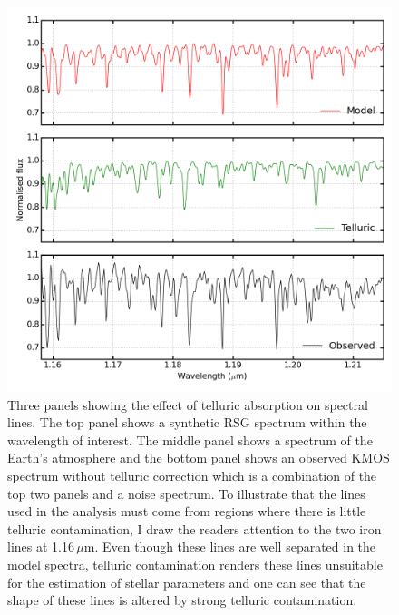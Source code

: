 \begin{figure}
 \centering
\includegraphics[width=\textwidth]{JAnal/tell-correction}
\caption{
Three panels showing the effect of telluric absorption on spectral lines.
The top panel shows a synthetic RSG spectrum within the wavelength of interest.
The middle panel shows a spectrum of the Earth's atmosphere and
the bottom panel shows an observed KMOS spectrum without telluric correction which is a combination of the top two panels and a noise spectrum.
To illustrate that the lines used in the analysis must come from regions where there is little telluric contamination, I draw the readers attention to the two iron lines at 1.16\,$\mu$m.
Even though these lines are well separated in the model spectra, telluric contamination renders these lines unsuitable for the estimation of  stellar parameters and one can see that the shape of these lines is altered by strong telluric contamination.
\label{fig:tell3pan}
         }
\end{figure}



